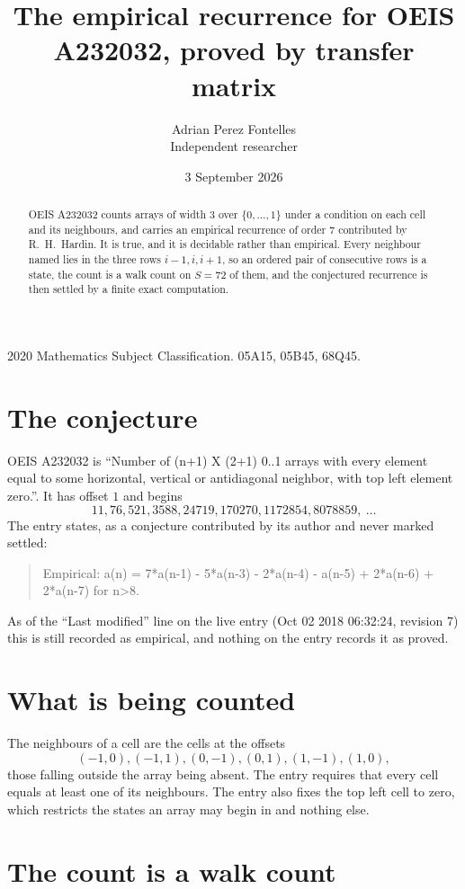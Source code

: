\documentclass[11pt,a4paper]{article}
\title{The empirical recurrence for OEIS A232032, proved by transfer matrix}
\author{Adrian Perez Fontelles\\ \small Independent researcher}
\date{3 September 2026}
\theoremstyle{plain}
\theoremstyle{definition}
\begin{document}
\maketitle

\begin{abstract}
OEIS A232032 counts arrays of width $3$ over $\{0,\dots,1\}$ under a condition on each cell
and its neighbours, and carries an empirical recurrence of order $7$ contributed by
R.~H.~Hardin. It is true, and it is decidable rather than empirical. Every neighbour named lies
in the three rows $i-1,i,i+1$, so an ordered pair of consecutive rows is a state, the count is
a walk count on $S=72$ of them, and the conjectured recurrence is then settled by a finite
exact computation.
\end{abstract}

\noindent\small 2020 Mathematics Subject Classification. 05A15, 05B45, 68Q45.\normalsize

\section{The conjecture}

OEIS A232032 is ``Number of (n+1) X (2+1) 0..1 arrays with every element equal to some horizontal, vertical or antidiagonal neighbor, with top left element zero.''. It has offset $1$ and begins
\[
11, 76, 521, 3588, 24719, 170270, 1172854, 8078859,\ \dots
\]
The entry states, as a conjecture contributed by its author and never marked settled:
\begin{quote}
Empirical: a(n) = 7*a(n-1) - 5*a(n-3) - 2*a(n-4) - a(n-5) + 2*a(n-6) + 2*a(n-7) for n>8.
\end{quote}
As of the ``Last modified'' line on the live entry (Oct 02 2018 06:32:24, revision 7) this is still
recorded as empirical, and nothing on the entry records it as proved.

\section{What is being counted}

The neighbours of a cell are the cells at the offsets
\[
(-1,0), (-1,1), (0,-1), (0,1), (1,-1), (1,0),
\]
those falling outside the array being absent. The entry requires that every cell equals at least one of its neighbours. The entry also fixes the top left cell to zero, which restricts the states an array may begin in and nothing else.

\section{The count is a walk count}
\end{document}
